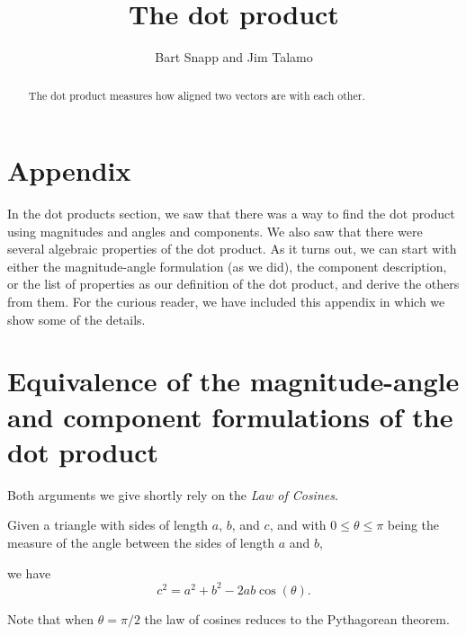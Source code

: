 \documentclass{ximera}
\author{Bart Snapp and Jim Talamo}
\title[Dig-In:]{The dot product}
\begin{document}
\begin{abstract}
  The dot product measures how aligned two vectors are with each
  other.
\end{abstract}
\maketitle

\section{Appendix}

In the dot products section, we saw that there was a way to find the dot product using magnitudes and angles and components.  We also saw that there were several algebraic properties of the dot product.  As it turns out, we can start with either the magnitude-angle formulation (as we did), the component description, or the list of properties as our definition of the dot product, and derive the others from them.  For the curious reader, we have included this appendix in which we show some of the details.
  
\section{Equivalence of the magnitude-angle and component formulations of the dot product}

Both arguments we give shortly rely on the \emph{Law of Cosines}.

\begin{theorem}
  Given a triangle with sides of length $a$, $b$, and $c$, and with
  $0\le\theta\le\pi$ being the measure of the angle between the sides
  of length $a$ and $b$,
  \begin{image}
  \end{image}
  we have
  \[
  c^2 = a^2+b^2-2ab\cos(\theta).
  \]
\end{theorem}

Note that when $\theta = \pi/2$ the law of cosines reduces to the Pythagorean theorem. 
\end{document}
